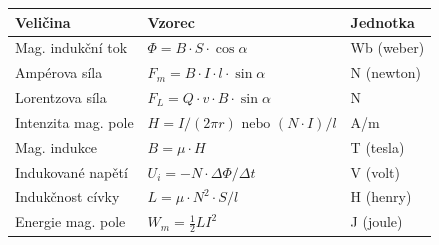 \documentclass[a4paper,10pt]{article}
\begin{document}
\begin{vysvetlenibox}
\begin{center}
\begin{tabularx}{0.97\linewidth}{@{} l l l @{}}
\toprule
\textbf{Veličina} & \textbf{Vzorec} & \textbf{Jednotka} \\
\midrule
Mag. indukční tok & $\Phi = B \cdot S \cdot \cos \alpha$ & Wb (weber) \\
Ampérova síla & $F_m = B \cdot I \cdot l \cdot \sin \alpha$ & N (newton) \\
Lorentzova síla & $F_L = Q \cdot v \cdot B \cdot \sin \alpha$ & N \\
Intenzita mag. pole & $H = I / (2\pi r) \text{ nebo } (N \cdot I) / l$ & A/m \\
Mag. indukce & $B = \mu \cdot H$ & T (tesla) \\
Indukované napětí & $U_i = - N \cdot \Delta \Phi / \Delta t$ & V (volt) \\
Indukčnost cívky & $L = \mu \cdot N^2 \cdot S / l$ & H (henry) \\
Energie mag. pole & $W_m = \frac{1}{2} L I^2$ & J (joule) \\
\bottomrule
\end{tabularx}
\end{center}

\end{vysvetlenibox}
\end{document}
